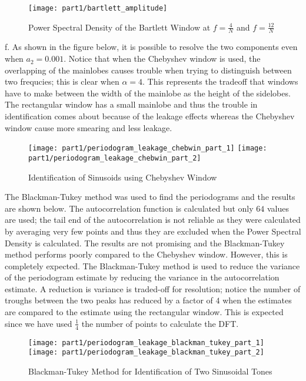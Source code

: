 \begin{figure}[H]
\centering{}
\texttt{[image: part1/bartlett\_amplitude]}
\caption{Power Spectral Density of the Bartlett Window at $f=\frac{4}{N}$ and $f=\frac{12}{N}$}
\end{figure}

\noindent{}f. As shown in the figure below, it is possible to resolve the two components even when $a_2=0.001$. Notice that when the Chebyshev window is used, the overlapping of the mainlobes causes trouble when trying to distinguish between two frequcies; this is clear when $\alpha=4$. This represents the tradeoff that windows have to make between the width of the mainlobe as the height of the sidelobes. The rectangular window has a small mainlobe and thus the trouble in identification comes about because of the leakage effects whereas the Chebyshev window cause more smearing and less leakage.

\begin{figure}[H]
\centering{}
\texttt{[image: part1/periodogram\_leakage\_chebwin\_part\_1]}
\texttt{[image: part1/periodogram\_leakage\_chebwin\_part\_2]}
\caption{Identification of Sinusoids using Chebyshev Window}
\end{figure}

\noindent{}The Blackman-Tukey method was used to find the periodograms and the results are shown below. The autocorrelation function is calculated but only $64$ values are used; the tail end of the autocorrelation is not reliable as they were calculated by averaging very few points and thus they are excluded when the Power Spectral Density is calculated. The results are not promising and the Blackman-Tukey method performs poorly compared to the Chebyshev window. However, this is completely expected. The Blackman-Tukey method is used to reduce the variance of the periodogram estimate by reducing the variance in the autocorrelation estimate. A reduction is variance is traded-off for resolution; notice the number of troughs between the two peaks has reduced by a factor of $4$ when the estimates are compared to the estimate using the rectangular window. This is expected since we have used $\frac{1}{4}$ the number of points to calculate the DFT.

\begin{figure}[H]
\centering{}
\texttt{[image: part1/periodogram\_leakage\_blackman\_tukey\_part\_1]}
\texttt{[image: part1/periodogram\_leakage\_blackman\_tukey\_part\_2]}
\caption{Blackman-Tukey Method for Identification of Two Sinusoidal Tones}
\end{figure}

